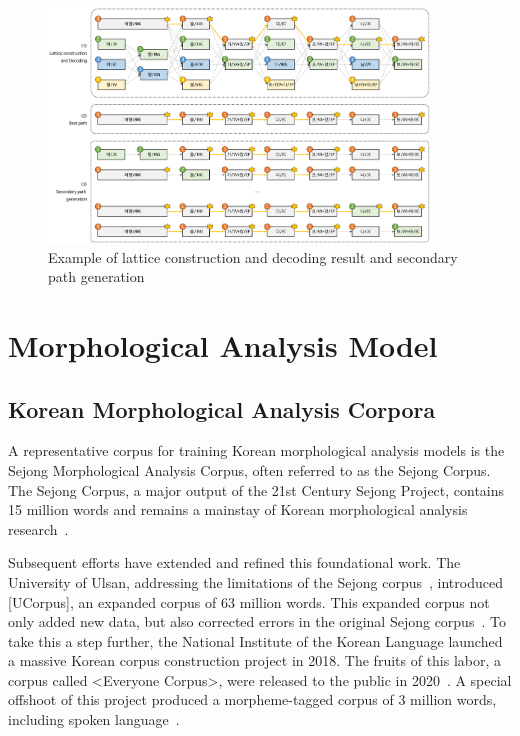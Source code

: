 \documentclass[AMS,STIX2COL]{WileyNJD-v2}
\begin{document}
    \begin{figure}[t]
        \centerline{\includegraphics[width=0.9\textwidth]{fig2.1}}
        \caption{Example of lattice construction and decoding result and secondary path generation}\label{fig:lattice}
    \end{figure}


    \section{Morphological Analysis Model}\label{sec:morphological-analysis-model}

    \subsection{Korean Morphological Analysis Corpora}\label{subsec3.1}

    A representative corpus for training Korean morphological analysis models is the Sejong Morphological Analysis Corpus, often referred to as the Sejong Corpus. The Sejong Corpus, a major output of the 21st Century Sejong Project, contains 15 million words and remains a mainstay of Korean morphological analysis research~\cite{ChoeMW2008}.

    Subsequent efforts have extended and refined this foundational work. The University of Ulsan, addressing the limitations of the Sejong corpus~\cite{KimIH2010}, introduced [UCorpus], an expanded corpus of 63 million words. This expanded corpus not only added new data, but also corrected errors in the original Sejong corpus~\cite{UCorpusHG}. To take this a step further, the National Institute of the Korean Language launched a massive Korean corpus construction project in 2018. The fruits of this labor, a corpus called <Everyone Corpus>, were released to the public in 2020~\cite{EveryoneCorpus}. A special offshoot of this project produced a morpheme-tagged corpus of 3 million words, including spoken language~\cite{KimIH2019}.
\end{document}
